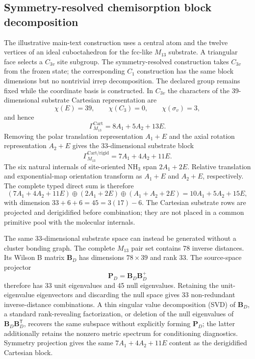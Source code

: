 \documentclass[10pt]{article}
\newcommand{\Bmat}{\mathbf{B}}
\begin{document}
\subsection{Symmetry-resolved chemisorption block decomposition}

The illustrative main-text construction uses a central atom and the twelve
vertices of an ideal cuboctahedron for the fcc-like \(M_{13}\) substrate.  A
triangular face selects a \(C_{3v}\) site subgroup.  The symmetry-resolved
construction takes \(C_{3v}\) from the frozen state; the corresponding
\(C_1\) construction has the same block dimensions but no nontrivial irrep
decomposition.  The declared group remains fixed while the coordinate basis is
constructed.  In \(C_{3v}\) the
characters of the 39-dimensional substrate Cartesian representation are
\[
 \chi(E)=39,\qquad \chi(C_3)=0,\qquad \chi(\sigma_v)=3,
\]
and hence
\[
 \Gamma_{M_{13}}^{\mathrm{Cart}}=8A_1+5A_2+13E.
\]
Removing the polar translation representation \(A_1+E\) and the axial
rotation representation \(A_2+E\) gives the 33-dimensional substrate block
\[
 \Gamma_{M_{13}}^{\mathrm{Cart}/\mathrm{rigid}}=7A_1+4A_2+11E.
\]
The six natural internals of site-oriented NH\(_3\) span \(2A_1+2E\).
Relative translation and exponential-map orientation transform as \(A_1+E\)
and \(A_2+E\), respectively.  The complete typed direct sum is
therefore
\[
 (7A_1+4A_2+11E)\oplus(2A_1+2E)\oplus(A_1+A_2+2E)
 =10A_1+5A_2+15E,
\]
with dimension \(33+6+6=45=3(17)-6\).  The Cartesian substrate rows are
projected and derigidified before combination; they are not placed in a common
primitive pool with the molecular internals.

The same 33-dimensional substrate space can instead be generated without a
cluster bonding graph.  The complete \(M_{13}\) pair set contains 78 inverse
distances.  Its {Wilson B matrix} \(\Bmat_D\) has dimensions \(78\times39\) and
rank 33.  The source-space projector
\[
 \mathbf P_D=\Bmat_D\Bmat_D^+
\]
therefore has 33 unit eigenvalues and 45 null eigenvalues.  Retaining the
unit-eigenvalue eigenvectors and discarding the null space gives 33
non-redundant inverse-distance combinations.  A thin singular value
decomposition (SVD) of \(\Bmat_D\), a standard rank-revealing factorization,\cite{GolubReinsch1970}
or
deletion of the null eigenvalues of
\(\Bmat_D\Bmat_D^{\mathsf T}\), recovers the same subspace without explicitly
forming \(\mathbf P_D\); the latter additionally retains the nonzero metric
spectrum for conditioning diagnostics.  Symmetry projection gives the same
\(7A_1+4A_2+11E\) content as the derigidified Cartesian block.
\end{document}
